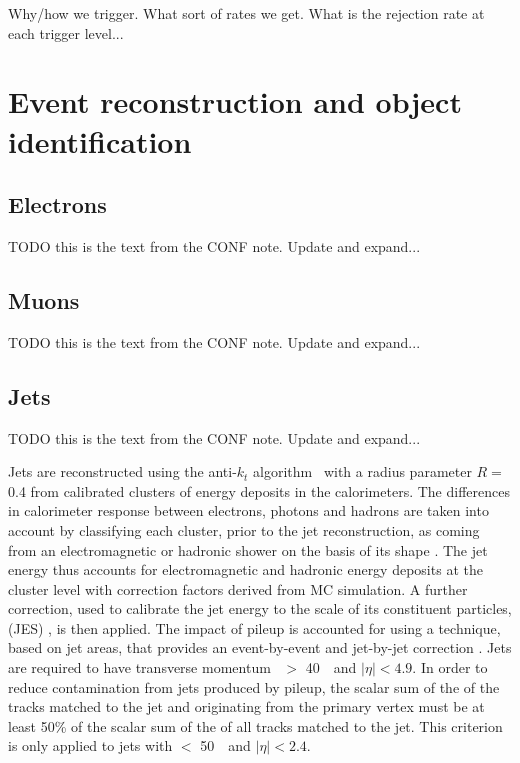 {\color{red} Why/how we trigger. What sort of rates we get. What is the
rejection rate at each trigger level...}

\section{Event reconstruction and object identification}

\subsection{Electrons} 
\label{sec:elctrons}

{\color{red} TODO this is the text from the CONF note. Update and expand...}

\subsection{Muons} 
\label{sec:muons}

{\color{red} TODO this is the text from the CONF note. Update and expand...}

\subsection{Jets} 
\label{sec:jets}

{\color{red} TODO this is the text from the CONF note. Update and expand...}

Jets are reconstructed using the anti-$k_{t}$
algorithm~\cite{Cacciari:2008gp, Cacciari:2005hq} with a radius
parameter $R = $ 0.4 from calibrated clusters of energy deposits in
the calorimeters. The differences in calorimeter response between
electrons, photons and hadrons are taken into account by classifying
each cluster, prior to the jet reconstruction, as coming from an
electromagnetic or hadronic shower on the basis of its shape
\cite{JES}.  The jet energy thus accounts for electromagnetic
and hadronic energy deposits at the cluster level with correction
factors derived from MC simulation.  A further correction,
used to calibrate the jet energy to the scale of its constituent
particles, (JES) \cite{JES,JES2}, is then applied.  The impact of
pileup is accounted for using
a technique, based on jet areas, that provides an event-by-event and
jet-by-jet correction \cite{Cacciari:2007fd}.  Jets are required
to have transverse momentum \pt\ $>$ 40~\GeV\ and $|\eta| < 4.9$.
In order to reduce contamination from jets produced by pileup,
the scalar sum of the \pt of the tracks matched to the jet and
originating from the primary vertex must be at least 50\% of the
scalar sum of the \pt of all tracks matched to the jet.  This
criterion is only applied to jets with \pt $<$ 50~\GeV\ and $|\eta| < 2.4$.

